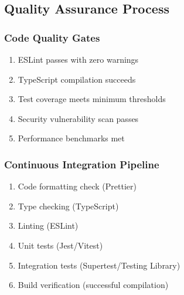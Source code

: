 \subsection{Quality Assurance Process}

\subsubsection{Code Quality Gates}
\begin{enumerate}
\item ESLint passes with zero warnings
\item TypeScript compilation succeeds
\item Test coverage meets minimum thresholds
\item Security vulnerability scan passes
\item Performance benchmarks met
\end{enumerate}

\subsubsection{Continuous Integration Pipeline}
\begin{enumerate}
\item Code formatting check (Prettier)
\item Type checking (TypeScript)
\item Linting (ESLint)
\item Unit tests (Jest/Vitest)
\item Integration tests (Supertest/Testing Library)
\item Build verification (successful compilation)
\end{enumerate}